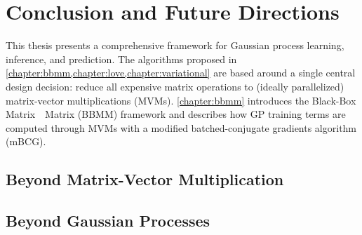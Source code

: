 \chapter{Conclusion and Future Directions}
\label{chapter:discussion}


This thesis presents a comprehensive framework for Gaussian process learning, inference, and prediction.
The algorithms proposed in \cref{chapter:bbmm,chapter:love,chapter:variational} are based around a single central design decision: reduce all expensive matrix operations to (ideally parallelized) matrix-vector multiplications (MVMs).
\cref{chapter:bbmm} introduces the Black-Box Matrix~\texttimes~Matrix (BBMM) framework and describes how GP training terms are computed through MVMs with a modified batched-conjugate gradients algorithm (mBCG).


\section{Beyond Matrix-Vector Multiplication}




\section{Beyond Gaussian Processes}

